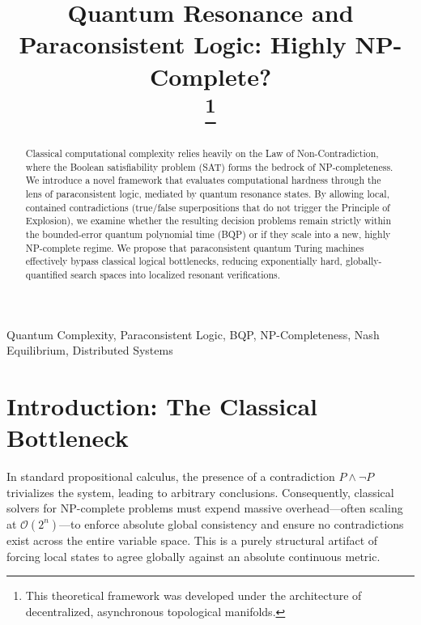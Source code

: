 \documentclass[conference]{IEEEtran}
\begin{document}
\title{Quantum Resonance and Paraconsistent Logic: Highly NP-Complete?\\
\thanks{This theoretical framework was developed under the architecture of decentralized, asynchronous topological manifolds.}
}

\author{
}

\maketitle

\begin{abstract}
Classical computational complexity relies heavily on the Law of Non-Contradiction, where the Boolean satisfiability problem (SAT) forms the bedrock of NP-completeness. We introduce a novel framework that evaluates computational hardness through the lens of paraconsistent logic, mediated by quantum resonance states. By allowing local, contained contradictions (true/false superpositions that do not trigger the Principle of Explosion), we examine whether the resulting decision problems remain strictly within the bounded-error quantum polynomial time (BQP) or if they scale into a new, highly NP-complete regime. We propose that paraconsistent quantum Turing machines effectively bypass classical logical bottlenecks, reducing exponentially hard, globally-quantified search spaces into localized resonant verifications.
\end{abstract}

\begin{IEEEkeywords}
Quantum Complexity, Paraconsistent Logic, BQP, NP-Completeness, Nash Equilibrium, Distributed Systems
\end{IEEEkeywords}

\section{Introduction: The Classical Bottleneck}
In standard propositional calculus, the presence of a contradiction $P \land \neg P$ trivializes the system, leading to arbitrary conclusions. Consequently, classical solvers for NP-complete problems must expend massive overhead---often scaling at $\mathcal{O}(2^n)$---to enforce absolute global consistency and ensure no contradictions exist across the entire variable space. This is a purely structural artifact of forcing local states to agree globally against an absolute continuous metric.
\end{document}
